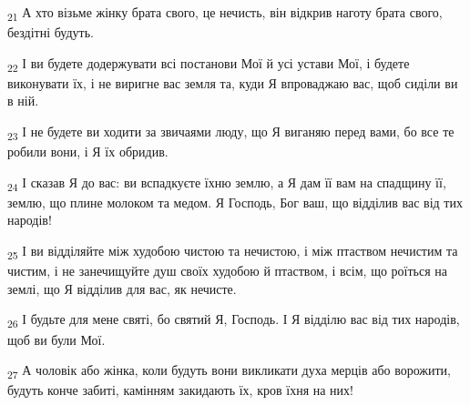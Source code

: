 \begin{tcolorbox}
\textsubscript{21} А хто візьме жінку брата свого, це нечисть, він відкрив наготу брата свого, бездітні будуть.
\end{tcolorbox}
\begin{tcolorbox}
\textsubscript{22} І ви будете додержувати всі постанови Мої й усі устави Мої, і будете виконувати їх, і не виригне вас земля та, куди Я впроваджаю вас, щоб сиділи ви в ній.
\end{tcolorbox}
\begin{tcolorbox}
\textsubscript{23} І не будете ви ходити за звичаями люду, що Я виганяю перед вами, бо все те робили вони, і Я їх обридив.
\end{tcolorbox}
\begin{tcolorbox}
\textsubscript{24} І сказав Я до вас: ви вспадкуєте їхню землю, а Я дам її вам на спадщину її, землю, що плине молоком та медом. Я Господь, Бог ваш, що відділив вас від тих народів!
\end{tcolorbox}
\begin{tcolorbox}
\textsubscript{25} І ви відділяйте між худобою чистою та нечистою, і між птаством нечистим та чистим, і не занечищуйте душ своїх худобою й птаством, і всім, що роїться на землі, що Я відділив для вас, як нечисте.
\end{tcolorbox}
\begin{tcolorbox}
\textsubscript{26} І будьте для мене святі, бо святий Я, Господь. І Я відділю вас від тих народів, щоб ви були Мої.
\end{tcolorbox}
\begin{tcolorbox}
\textsubscript{27} А чоловік або жінка, коли будуть вони викликати духа мерців або ворожити, будуть конче забиті, камінням закидають їх, кров їхня на них!
\end{tcolorbox}

